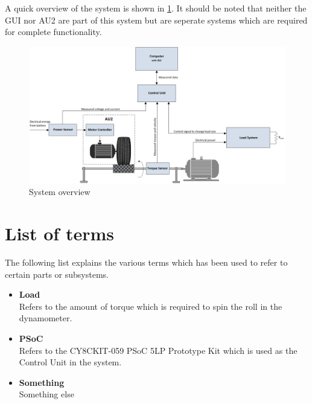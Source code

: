 A quick overview of the system is shown in \ref{fig:System_overview}. It should be noted that neither the GUI nor AU2 are part of this system but are seperate systems which are required for complete functionality.

\begin{figure}[H]
	\centering
	\includegraphics[width=1\linewidth]{Introduction/Overview}
	\caption{System overview}
	\label{fig:System_overview}
\end{figure}

\section{List of terms}
The following list explains the various terms which has been used to refer to certain parts or subsystems.
\begin{itemize}
	\item \textbf{Load}\\
	Refers to the amount of torque which is required to spin the roll in the dynamometer.
	\item \textbf{PSoC}\\
	Refers to the CY8CKIT-059 PSoC 5LP Prototype Kit which is used as the Control Unit in the system.
	\item \textbf{Something}\\
	Something else
\end{itemize}